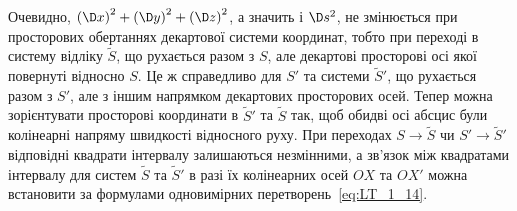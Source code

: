 Очевидно, ${\left(\D x\right)}^2+{\left(\D y\right)}^2+{\left(\D z\right)}^2$, а значить і $\D s^2$, не
змінюється при просторових обертаннях декартової системи координат, тобто при переході в систему відліку $\tilde{S}$, що
рухається разом з $S$, але декартові просторові осі якої повернуті відносно $S$. Це ж справедливо для $S'$ та системи
$\tilde{S}'$, що рухається разом з $S'$, але з іншим напрямком декартових просторових осей. Тепер можна зорієнтувати
просторові координати в $\tilde{S}'$ та $\tilde{S}$ так, щоб обидві осі абсцис були колінеарні напряму швидкості
відносного руху. При переходах $S \to \tilde{S}$ чи $S' \to \tilde{S}'$ відповідні квадрати інтервалу залишаються
незмінними, а зв'язок між квадратами інтервалу для систем $\tilde{S}$ та $\tilde{S}'$ в разі їх колінеарних осей $OX$ та
$OX'$ можна встановити за формулами одновимірних перетворень~\eqref{eq:LT_1_14}.

